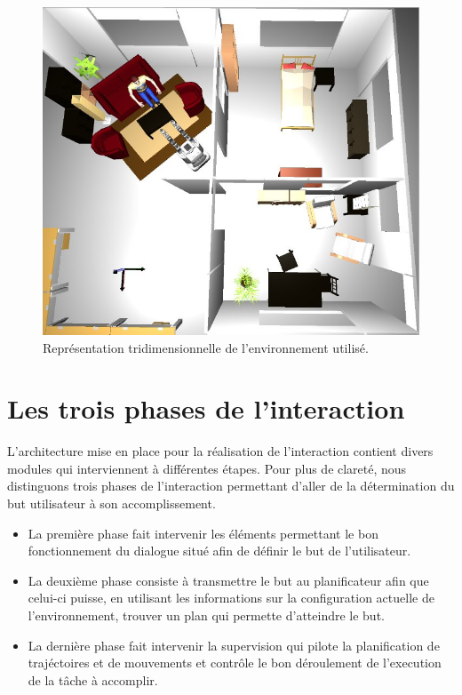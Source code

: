 \documentclass[a4paper,11pt,twoside]{StyleThese}
\begin{document}
\begin{figure}[ht!]
 \centering
  \includegraphics[width=0.89\linewidth]{./img/mardiSetup.jpg} 
  \caption {Représentation tridimensionnelle de l'environnement utilisé.}
  \label{fig:env}
\end{figure}


\section{Les trois phases de l'interaction}
\label{sec:troisPhases}



L'architecture mise en place pour la réalisation de l'interaction contient divers modules qui interviennent à différentes étapes.
Pour plus de clareté, nous distinguons trois phases de l'interaction permettant d'aller de la détermination du but utilisateur à son accomplissement. 

\begin{itemize}
\item La première phase fait intervenir les éléments permettant le bon fonctionnement du dialogue situé afin de définir le but de l'utilisateur.
\item La deuxième phase consiste à transmettre le but au planificateur afin que celui-ci puisse, en utilisant les informations sur la configuration actuelle de l'environnement, trouver un plan qui permette d'atteindre le but. 
\item La dernière phase fait intervenir la supervision qui pilote la planification de trajéctoires et de mouvements et contrôle le bon déroulement de l'execution de la tâche à accomplir.
\end{itemize}
\end{document}
